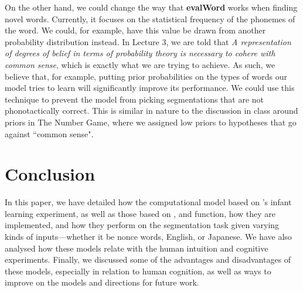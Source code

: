 \documentclass{article}
\begin{document}
On the other hand, we could change the way that \textbf{evalWord} works when finding novel words. Currently, it focuses on the statistical frequency of the phonemes of the word. We could, for example, have this value be drawn from another probability distribution instead. In Lecture 3, we are told that {\it{A representation of degrees of belief in terms of probability theory is necessary to cohere with common sense}}, which is exactly what we are trying to achieve. As such, we believe that, for example, putting prior probabilities on the types of words our model tries to learn will significantly improve its performance. We could use this technique to prevent the model from picking segmentations that are not phonotactically correct. This is similar in nature to the discussion in class around priors in The Number Game, where we assigned low priors to hypotheses that go against ``common sense".
\vspace{-2mm}
\section{Conclusion}
\vspace{-1mm}
In this paper, we have detailed how the computational model based on \citet{Saffran1996}'s infant learning experiment, as well as those based on \citet{segaran_hammerbacher_2009}, and \citet{Venkataraman}
function, how they are implemented, and how they perform on the segmentation task given varying kinds of inputs---whether it be nonce words, English, or Japanese. We have also analysed how these models relate with the human intuition and cognitive experiments. Finally, we discussed some of the advantages and disadvantages of these models, especially in relation to human cognition, as well as ways to improve on the models and directions for future work.
\vspace{-2mm}
\end{document}
